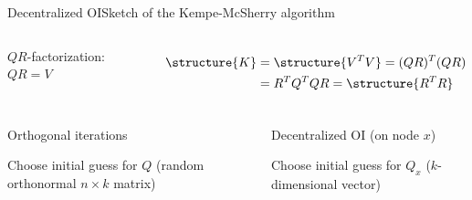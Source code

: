 \documentclass[xcolor=table,final]{beamer} %
\begin{document}
\begin{frame}{Decentralized OI}{Sketch of the Kempe-McSherry algorithm}
  \begin{columns}
    $QR$-factorization: $QR = V$

    \begin{align*}
      \structure{K}& = \structure{V^TV} = (QR)^T(QR) \\ &= R^TQ^TQR = \structure{R^T R}
    \end{align*}
  \end{columns}

  \begin{columns}
    \begin{block}{Orthogonal iterations}
      \begin{algorithm}[H]
        \BlankLine

        Choose initial guess for $Q$ {\small (random orthonormal $n \times k$ matrix)} \;

      \end{algorithm}
    \end{block}
    \begin{block}{Decentralized OI  (on node $x$)}
      \begin{algorithm}[H]
        \BlankLine

        Choose initial guess for $Q_x$ ($k$-dimensional vector) \;

      \end{algorithm}
    \end{block}
  \end{columns}
\end{frame}
\end{document}
